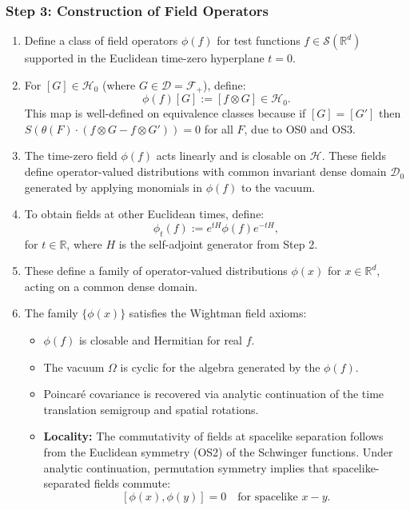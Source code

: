 \documentclass{article}
\newcommand{\1}{\mathbbm{1}}
\theoremstyle{plain}
\theoremstyle{definition}
\numberwithin{equation}{section}
\begin{document}
\subsubsection*{Step 3: Construction of Field Operators}

\begin{enumerate}
  \item Define a class of field operators $\phi(f)$ for test functions $f \in \mathcal{S}(\mathbb{R}^d)$ supported in the Euclidean time-zero hyperplane $t = 0$.

  \item For $[G] \in \mathcal{H}_0$ (where $G \in \mathscr{D} = \mathcal{F}_+$), define:
  \[
  \phi(f)[G] := [f \otimes G] \in \mathcal{H}_0.
  \]
  This map is well-defined on equivalence classes because if $[G] = [G']$ then $S(\theta(F) \cdot (f \otimes G - f \otimes G')) = 0$ for all $F$, due to OS0 and OS3.

  \item The time-zero field $\phi(f)$ acts linearly and is closable on $\mathcal{H}$. These fields define operator-valued distributions with common invariant dense domain $\mathscr{D}_0$ generated by applying monomials in $\phi(f)$ to the vacuum.

  \item To obtain fields at other Euclidean times, define:
  \[
  \phi_t(f) := e^{tH} \phi(f) e^{-tH},
  \]
  for $t \in \mathbb{R}$, where $H$ is the self-adjoint generator from Step 2.

  \item These define a family of operator-valued distributions $\phi(x)$ for $x \in \mathbb{R}^d$, acting on a common dense domain.

  \item The family $\{ \phi(x) \}$ satisfies the Wightman field axioms:
  \begin{itemize}
    \item $\phi(f)$ is closable and Hermitian for real $f$.
    \item The vacuum $\Omega$ is cyclic for the algebra generated by the $\phi(f)$.
    \item Poincaré covariance is recovered via analytic continuation of the time translation semigroup and spatial rotations.
    \item \textbf{Locality:} The commutativity of fields at spacelike separation follows from the Euclidean symmetry (OS2) of the Schwinger functions. Under analytic continuation, permutation symmetry implies that spacelike-separated fields commute:
    \[
    [\phi(x), \phi(y)] = 0 \quad \text{for spacelike } x - y.
    \]
  \end{itemize}
\end{enumerate}
\end{document}
